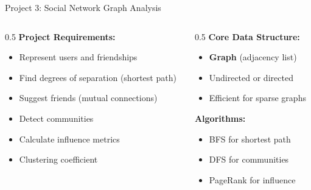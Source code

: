 \documentclass[aspectratio=169,xcolor=dvipsnames]{beamer}
\begin{document}
\begin{frame}{Project 3: Social Network Graph Analysis}
  \begin{columns}
    \begin{column}{0.5\textwidth}
      \textbf{Project Requirements:}
      \begin{itemize}
        \item Represent users and friendships
        \item Find degrees of separation (shortest path)
        \item Suggest friends (mutual connections)
        \item Detect communities
        \item Calculate influence metrics
        \item Clustering coefficient
      \end{itemize}
    \end{column}

    \begin{column}{0.5\textwidth}
      \textbf{Core Data Structure:}
      \begin{itemize}
        \item \textbf{Graph} (adjacency list)
        \item Undirected or directed
        \item Efficient for sparse graphs
      \end{itemize}

      \vspace{0.3cm}
      \textbf{Algorithms:}
      \begin{itemize}
        \item BFS for shortest path
        \item DFS for communities
        \item PageRank for influence
      \end{itemize}
    \end{column}
  \end{columns}
\end{frame}
\end{document}
